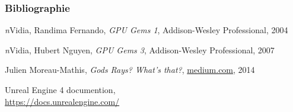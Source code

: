 \documentclass[10pt]{beamer}
\begin{document}
\begin{frame}
	\frametitle{Bibliographie}
    
    \begin{thebibliography}{}
    
    \bibitem{} 
    \textit{n}Vidia, Randima Fernando, \textit{GPU Gems 1}, Addison-Wesley Professional, 2004

    \bibitem{} 
    \textit{n}Vidia, Hubert Nguyen, \textit{GPU Gems 3}, Addison-Wesley Professional, 2007
    
    \bibitem{}
    Julien Moreau-Mathis, \textit{Gods Rays? What's that?},  \url{medium.com}, 2014

    \bibitem{}
    Unreal Engine 4 documention,
    \\\url{https://docs.unrealengine.com/}
    
    \end{thebibliography}


\end{frame}

\end{document}
